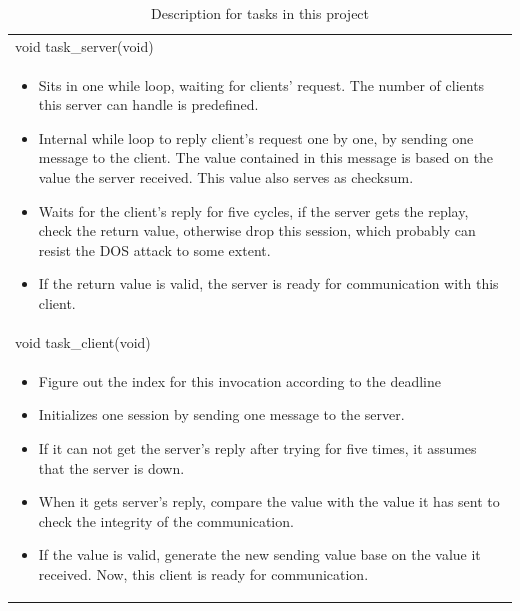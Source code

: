 \documentclass{report}
\begin{document}
{\begin{table}[p]
  \begin{tabularx}{\textwidth}{| X |}
    \hline
    void task\_server(void) \\
    \begin{itemize}
      \item Sits in one while loop, waiting for clients' request. The number of clients this server can handle is predefined.

      \item Internal while loop to reply client's request one by one, by sending one message to the client. The value contained in this message is based on the value the server received. This value also serves as checksum.

      \item Waits for the client's reply for five cycles, if the server gets the replay, check the return value, otherwise drop this session, which probably can resist the DOS attack to some extent.
      \item If the return value is valid, the server is ready for communication with this client.
    \end{itemize}
    \\

    \hline
    void task\_client(void) \\
    \begin{itemize}
      \item Figure out the index for this invocation according to the deadline

      \item Initializes one session by sending one message to the server.

      \item If it can not get the server's reply after trying for five times, it assumes that the server is down.

      \item When it gets server's reply, compare the value with the value it has sent to check the integrity of the communication.

      \item If the value is valid, generate the new sending value base on the value it received. Now, this client is ready for communication.
    \end{itemize}
    \\
    \hline
  \end{tabularx}
  \caption{Description for tasks in this project}
\end{table}

}
\end{document}
